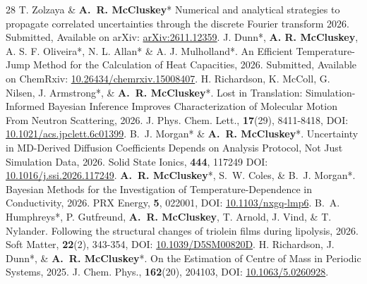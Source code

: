 \vspace{-0.4cm}
\begin{paperenumerate}{28}
  \sloppy
   \cvpaper
    {T. Zolzaya \& \textbf{A.~R. McCluskey}*}
    {Numerical and analytical strategies to propagate correlated uncertainties through the discrete Fourier transform}
    {2026.}
    {Submitted,}
    {}
    {Available on arXiv: \href{http://arxiv.org/abs/2611.12359}{arXiv:2611.12359}.}
   \cvpaper
    {J. Dunn*, \textbf{A. R. McCluskey}, A. S. F. Oliveira*, N. L. Allan* \& A. J. Mulholland*.}
    {An Efficient Temperature-Jump Method for the Calculation of Heat Capacities,}
    {2026.}
    {Submitted,}
    {}
    {Available on ChemRxiv: \href{https://doi.org/10.26434/chemrxiv.15008407/}{10.26434/chemrxiv.15008407}.}
   \cvpaper
    {H. Richardson, K. McColl, G. Nilsen, J. Armstrong*, \& \textbf{A.~R. McCluskey}*.}
    {Lost in Translation: Simulation-Informed Bayesian Inference Improves Characterization of Molecular Motion From Neutron Scattering,}
    {2026.}
    {J. Phys. Chem. Lett.,}
    {\textbf{17}(29), 8411-8418,}
    {DOI: \href{https://doi.org/10.1021/acs.jpclett.6c01399}{10.1021/acs.jpclett.6c01399}.}
   \cvpaper
    {B.~J. Morgan* \& \textbf{A.~R. McCluskey}*.}
    {Uncertainty in MD-Derived Diffusion Coefficients Depends on Analysis Protocol, Not Just Simulation Data,}
    {2026.}
    {Solid State Ionics,}
    {\textbf{444}, 117249}
    {DOI: \href{https://doi.org/10.1016/j.ssi.2026.117249}{10.1016/j.ssi.2026.117249}.}
   \cvpaper
    {\textbf{A.~R. McCluskey}*, S.~W. Coles, \& B.~J. Morgan*.}
    {Bayesian Methods for the Investigation of Temperature-Dependence in Conductivity,}
    {2026.}
    {PRX Energy,}
    {\textbf{5}, 022001,}
    {DOI: \href{https://doi.org/10.1103/nxgq-lmp6}{10.1103/nxgq-lmp6}.}
   \cvpaper
    {B.~A. Humphreys*, P. Gutfreund, \textbf{A.~R. McCluskey}, T. Arnold, J. Vind, \& T. Nylander.}
    {Following the structural changes of triolein films during lipolysis,}
    {2026.}
    {Soft Matter,}
    {\textbf{22}(2), 343-354,}
    {DOI: \href{https://doi.org/10.1039/D5SM00820D}{10.1039/D5SM00820D}.}
   \cvpaper
    {H. Richardson, J. Dunn*, \& \textbf{A.~R. McCluskey}*.}
    {On the Estimation of Centre of Mass in Periodic Systems,}
    {2025.}
    {J. Chem. Phys.,}
    {\textbf{162}(20), 204103,}
    {DOI: \href{https://doi.org/10.1063/5.0260928}{10.1063/5.0260928}.}

\end{paperenumerate}
